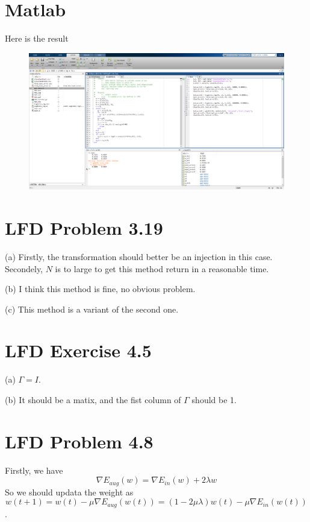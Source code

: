\documentclass{article}
\begin{document}
\maketitle
\section{Matlab}
Here is the result
\begin{figure}[H]\centering\includegraphics[width=\textwidth]{01.png}\end{figure}
\section{LFD Problem 3.19}
\begin{tlist}{4}
	\item[(a)] Firstly, the transformation should better be an injection in this case. Secondely, $N$ is to large to get this method return in a reasonable time.
	\item[(b)] I think this method is fine, no obvious problem.
	\item[(c)] This method is a variant of the second one.
\end{tlist}
\section{LFD Exercise 4.5}
\begin{tlist}{4}
  \item[(a)] $\Gamma = I$.
  \item[(b)] It should be a matix, and the fist column of $\Gamma$ should be 1.
\end{tlist}
\section{LFD Problem 4.8}
Firstly, we have $$\nabla E_{aug}(w)=\nabla E_{in}(w)+2\lambda w$$ So we should updata the weight as $$w(t+1)=w(t)-\mu\nabla E_{aug}(w(t))=(1-2\mu\lambda)w(t)-\mu\nabla E_{in}(w(t))$$.
\end{document}
